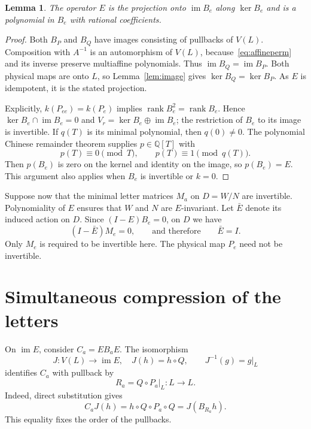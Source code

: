 \documentclass[acmlarge,screen,11pt,nonacm]{acmart}
\newcommand{\Q}{\mathbb{Q}}
\newcommand{\im}{\operatorname{im}}
\newtheorem{lemma}[theorem]{Lemma}
\theoremstyle{definition}
\begin{document}
\begin{lemma}\label{lem:projection}
The operator $E$ is the projection onto $\im B_e$ along $\ker B_e$ and is a polynomial in $B_e$ with rational coefficients.
\end{lemma}
\begin{proof}
Both $B_P$ and $B_Q$ have images consisting of pullbacks of $V(L)$. Composition with $A^{-1}$ is an automorphism of $V(L)$, because~\eqref{eq:affineperm} and its inverse preserve multiaffine polynomials. Thus $\im B_Q=\im B_P$. Both physical maps are onto $L$, so Lemma~\ref{lem:image} gives $\ker B_Q=\ker B_P$. As $E$ is idempotent, it is the stated projection.

Explicitly, $k(P_{ee})=k(P_e)$ implies $\operatorname{rank}B_e^2=\operatorname{rank}B_e$. Hence $\ker B_e\cap\im B_e=0$ and $V_r=\ker B_e\oplus\im B_e$; the restriction of $B_e$ to its image is invertible. If $q(T)$ is its minimal polynomial, then $q(0)\ne0$. The polynomial Chinese remainder theorem supplies $p\in\Q[T]$ with
\[
 p(T)\equiv0\pmod T,\qquad p(T)\equiv1\pmod{q(T)}.
\]
Then $p(B_e)$ is zero on the kernel and identity on the image, so $p(B_e)=E$. This argument also applies when $B_e$ is invertible or $k=0$.
\end{proof}

Suppose now that the minimal letter matrices $M_a$ on $D=W/N$ are invertible. Polynomiality of $E$ ensures that $W$ and $N$ are $E$-invariant. Let $\bar E$ denote its induced action on $D$. Since $(I-E)B_e=0$, on $D$ we have
\begin{equation}\label{eq:identityquotient}
 (I-\bar E)M_e=0,\qquad\text{and therefore}\qquad\bar E=I.
\end{equation}
Only $M_e$ is required to be invertible here. The physical map $P_e$ need not be invertible.

\section{Simultaneous compression of the letters}\label{sec:compression}
On $\im E$, consider $C_a=EB_aE$. The isomorphism
\[
 J:V(L)\longrightarrow\im E,\quad J(h)=h\circ Q,
 \qquad J^{-1}(g)=g|_L
\]
identifies $C_a$ with pullback by
\begin{equation}\label{eq:Ra}
 R_a=Q\circ P_a|_L:L\longrightarrow L.
\end{equation}
Indeed, direct substitution gives
\[
 C_aJ(h)=h\circ Q\circ P_a\circ Q=J(B_{R_a}h).
\]
This equality fixes the order of the pullbacks.
\end{document}
